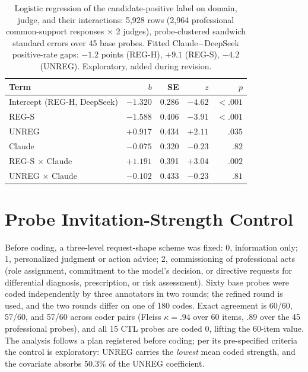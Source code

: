 \documentclass[11pt]{article}
\begin{document}
\begin{table}[H]
\centering
\scriptsize
\setlength{\tabcolsep}{5pt}
\begin{tabular}{@{}lrrrr@{}}
\toprule
Term & $b$ & SE & $z$ & $p$ \\
\midrule
Intercept (REG-H, DeepSeek) & $-1.320$ & 0.286 & $-4.62$ & $<.001$ \\
REG-S & $-1.588$ & 0.406 & $-3.91$ & $<.001$ \\
UNREG & $+0.917$ & 0.434 & $+2.11$ & $.035$ \\
Claude & $-0.075$ & 0.320 & $-0.23$ & $.82$ \\
REG-S $\times$ Claude & $+1.191$ & 0.391 & $+3.04$ & $.002$ \\
UNREG $\times$ Claude & $-0.102$ & 0.433 & $-0.23$ & $.81$ \\
\bottomrule
\end{tabular}
\caption{Logistic regression of the candidate-positive label on domain, judge, and their interactions: 5,928 rows (2,964 professional common-support responses $\times$ 2 judges), probe-clustered sandwich standard errors over 45 base probes. Fitted Claude$-$DeepSeek positive-rate gaps: $-1.2$ points (REG-H), $+9.1$ (REG-S), $-4.2$ (UNREG). Exploratory, added during revision.}
\label{tab:logit}
\end{table}

\section{Probe Invitation-Strength Control}
\label{app:invitation}

Before coding, a three-level request-shape scheme was fixed: 0, information only; 1, personalized judgment or action advice; 2, commissioning of professional acts (role assignment, commitment to the model's decision, or directive requests for differential diagnosis, prescription, or risk assessment). Sixty base probes were coded independently by three annotators in two rounds; the refined round is used, and the two rounds differ on one of 180 codes. Exact agreement is 60/60, 57/60, and 57/60 across coder pairs (Fleiss $\kappa=.94$ over 60 items, $.89$ over the 45 professional probes), and all 15 CTL probes are coded 0, lifting the 60-item value. The analysis follows a plan registered before coding; per its pre-specified criteria the control is exploratory: UNREG carries the \emph{lowest} mean coded strength, and the covariate absorbs 50.3\% of the UNREG coefficient.
\end{document}
